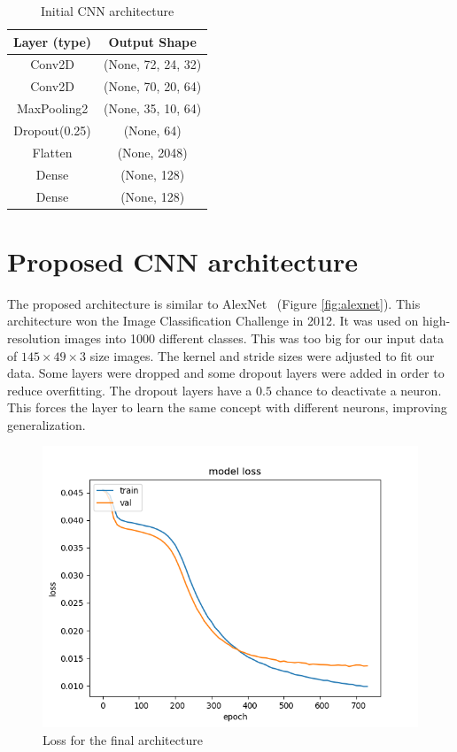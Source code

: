 \begin{table} [h!]
	\centering
	\caption{Initial CNN architecture}
	\begin{tabular}{ |c|c|} 
		\hline
		Layer (type) & Output Shape  \\ \hline
		Conv2D &  (None, 72, 24, 32) \\ \hline
		Conv2D & (None, 70, 20, 64)\\ \hline
		MaxPooling2 & (None, 35, 10, 64) \\ \hline
		Dropout(0.25) & (None, 64)\\ \hline
		Flatten & (None, 2048) \\ \hline
		Dense & (None, 128) \\ \hline
		Dense & (None, 128) \\ \hline				
	\end{tabular}
	\label{table:initial}
\end{table}

\section{Proposed CNN architecture}
The proposed architecture is similar to AlexNet~\cite{alexnet} (Figure \ref{fig:alexnet}). This architecture won the Image Classification Challenge in 2012\cite{challenge_2012}. It was used on high-resolution images into 1000 different classes. This was too big for our input data of $145\times49\times3$ size images. The kernel and stride sizes were adjusted to fit our data. Some layers were dropped and some dropout layers were added in order to reduce overfitting. The dropout layers have a $0.5$ chance to deactivate a neuron. This forces the layer to learn the same concept with different neurons, improving generalization.
\par

\begin{figure}[h!]
	\caption[Loss progression over the epochs]{ Loss for the final architecture}
	\centering
	\label{fig:loss}
	\includegraphics[width=1\textwidth, height=\textheight, keepaspectratio]{"resources/loss"}
\end{figure}


